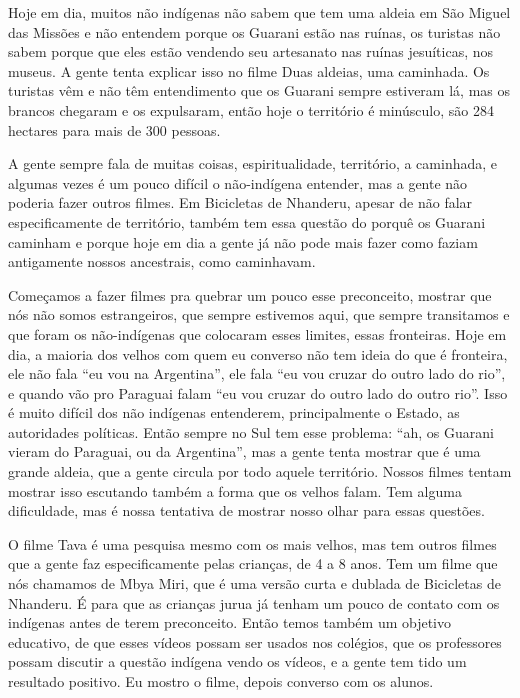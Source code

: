 Hoje em dia, muitos não indígenas não sabem que tem uma aldeia em São
Miguel das Missões e não entendem porque os Guarani estão nas ruínas,
os turistas não sabem porque que eles estão vendendo seu artesanato nas
ruínas jesuíticas, nos museus. A gente tenta explicar isso no filme
Duas aldeias, uma caminhada. Os turistas vêm e não têm entendimento que
os Guarani sempre estiveram lá, mas os brancos chegaram e os
expulsaram, então hoje o território é minúsculo, são 284 hectares para
mais de 300 pessoas.

A gente sempre fala de muitas coisas, espiritualidade, território, a
caminhada, e algumas vezes é um pouco difícil o não-indígena entender,
mas a gente não poderia fazer outros filmes. Em Bicicletas de Nhanderu,
apesar de não falar especificamente de território, também tem essa
questão do porquê os Guarani caminham e porque hoje em dia a gente já
não pode mais fazer como faziam antigamente nossos ancestrais, como
caminhavam.

Começamos a fazer filmes pra quebrar um pouco esse preconceito, mostrar
que nós não somos estrangeiros, que sempre estivemos aqui, que sempre
transitamos e que foram os não-indígenas que colocaram esses limites,
essas fronteiras. Hoje em dia, a maioria dos velhos com quem eu
converso não tem ideia do que é fronteira, ele não fala ``eu vou na
Argentina'', ele fala ``eu vou cruzar do outro lado do rio'', e quando vão
pro Paraguai falam ``eu vou cruzar do outro lado do outro rio''. Isso é
muito difícil dos não indígenas entenderem, principalmente o Estado, as
autoridades políticas. Então sempre no Sul tem esse problema: ``ah, os
Guarani vieram do Paraguai, ou da Argentina'', mas a gente tenta mostrar
que é uma grande aldeia, que a gente circula por todo aquele
território. Nossos filmes tentam mostrar isso escutando também a forma
que os velhos falam. Tem alguma dificuldade, mas é nossa tentativa de
mostrar nosso olhar para essas questões.

O filme Tava é uma pesquisa mesmo com os mais velhos, mas tem outros
filmes que a gente faz especificamente pelas crianças, de 4 a 8 anos.
Tem um filme que nós chamamos de Mbya Miri, que é uma
versão curta e dublada de Bicicletas de Nhanderu. É para que as
crianças jurua já tenham um pouco de contato com os indígenas antes de
terem preconceito. Então temos também um objetivo educativo, de que
esses vídeos possam ser usados nos colégios, que os professores possam
discutir a questão indígena vendo os vídeos, e a gente tem tido um
resultado positivo. Eu mostro o filme, depois converso com os alunos. 

